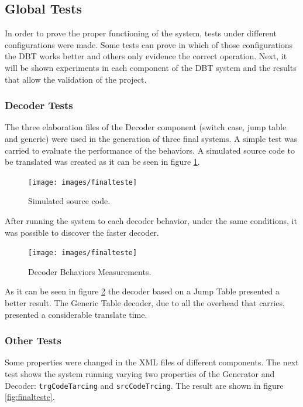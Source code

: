 \documentclass[12pt]{article}
\begin{document}
{\subsection{Global Tests}

In order to prove the proper functioning of the system, tests under different configurations were made. Some tests can prove in which of those configurations the DBT works better and others only evidence the correct operation. 
Next, it will be shown experiments in each component of the DBT system and the results that allow the validation of the project.

\subsubsection{Decoder Tests}
The three elaboration files of the Decoder component (switch case, jump table and generic) were used in the generation of three final systems. A simple test was carried to evaluate the performance of the behaviors. A simulated source code to be translated was created as it can be seen in figure \ref{fig:SourceCodeDecoderTest}.

\begin{figure}[H]
\centerline{
\texttt{[image: images/finalteste]}
}
\caption{Simulated source code.}
\label{fig:SourceCodeDecoderTest}
\end{figure}

After running the system to each decoder behavior, under the same conditions, it was possible to discover the faster decoder.

\begin{figure}[H]
\centerline{
\texttt{[image: images/finalteste]}
}
\caption{Decoder Behaviors Measurements.}
\label{fig:DecoderBehaviorsMeasurements}
\end{figure}

As it can be seen in figure \ref{fig:DecoderBehaviorsMeasurements} the decoder based on a Jump Table presented a better result. The Generic Table decoder, due to all the overhead that carries, presented a considerable translate time.

\subsubsection{Other Tests}
Some properties were changed in the XML files of different components. The next test shows the system running varying two properties of the Generator and Decoder: \texttt{trgCodeTarcing} and \texttt{srcCodeTrcing}. The result are shown in figure \ref{fig:finalteste}.

}
\end{document}
